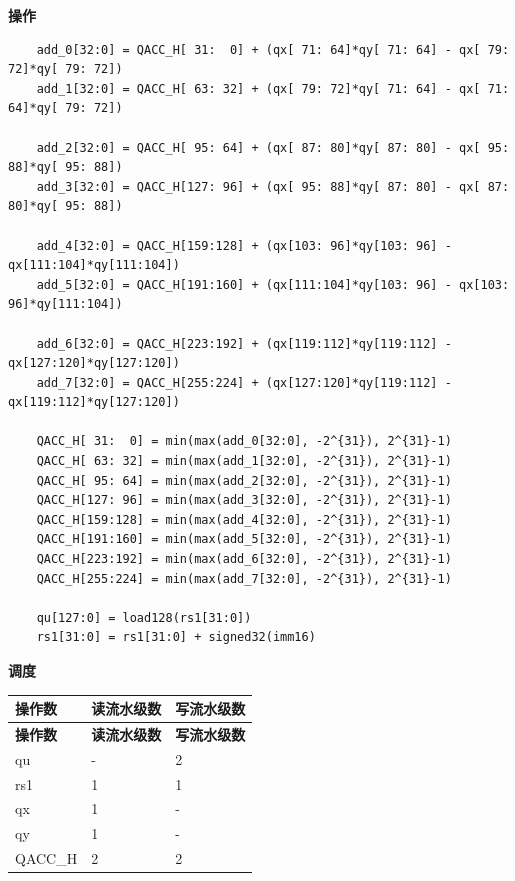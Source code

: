\textbf{操作}\\
\begin{lstlisting}
    add_0[32:0] = QACC_H[ 31:  0] + (qx[ 71: 64]*qy[ 71: 64] - qx[ 79: 72]*qy[ 79: 72])
    add_1[32:0] = QACC_H[ 63: 32] + (qx[ 79: 72]*qy[ 71: 64] - qx[ 71: 64]*qy[ 79: 72])

    add_2[32:0] = QACC_H[ 95: 64] + (qx[ 87: 80]*qy[ 87: 80] - qx[ 95: 88]*qy[ 95: 88])
    add_3[32:0] = QACC_H[127: 96] + (qx[ 95: 88]*qy[ 87: 80] - qx[ 87: 80]*qy[ 95: 88])

    add_4[32:0] = QACC_H[159:128] + (qx[103: 96]*qy[103: 96] - qx[111:104]*qy[111:104])
    add_5[32:0] = QACC_H[191:160] + (qx[111:104]*qy[103: 96] - qx[103: 96]*qy[111:104])

    add_6[32:0] = QACC_H[223:192] + (qx[119:112]*qy[119:112] - qx[127:120]*qy[127:120])
    add_7[32:0] = QACC_H[255:224] + (qx[127:120]*qy[119:112] - qx[119:112]*qy[127:120])

    QACC_H[ 31:  0] = min(max(add_0[32:0], -2^{31}), 2^{31}-1)
    QACC_H[ 63: 32] = min(max(add_1[32:0], -2^{31}), 2^{31}-1)
    QACC_H[ 95: 64] = min(max(add_2[32:0], -2^{31}), 2^{31}-1)
    QACC_H[127: 96] = min(max(add_3[32:0], -2^{31}), 2^{31}-1)
    QACC_H[159:128] = min(max(add_4[32:0], -2^{31}), 2^{31}-1)
    QACC_H[191:160] = min(max(add_5[32:0], -2^{31}), 2^{31}-1)
    QACC_H[223:192] = min(max(add_6[32:0], -2^{31}), 2^{31}-1)
    QACC_H[255:224] = min(max(add_7[32:0], -2^{31}), 2^{31}-1)

    qu[127:0] = load128(rs1[31:0])
    rs1[31:0] = rs1[31:0] + signed32(imm16)
\end{lstlisting}

\textbf{调度}\\
\begin{longtable}[c]{|l|l|l|}
    \hline
    \rowcolor{lightgray}
    \textbf{操作数} & \textbf{读流水级数} & \textbf{写流水级数} \\\hline
    \endfirsthead
    \hline
    \rowcolor{lightgray}
     \textbf{操作数} & \textbf{读流水级数} & \textbf{写流水级数} \\\hline
    \endhead
    \hline
    \endfoot

    qu & - & 2 \\\hline
    rs1 & 1 & 1 \\\hline
     qx & 1 & - \\\hline
     qy & 1 & - \\\hline
     QACC\_H & 2 & 2

\end{longtable}

